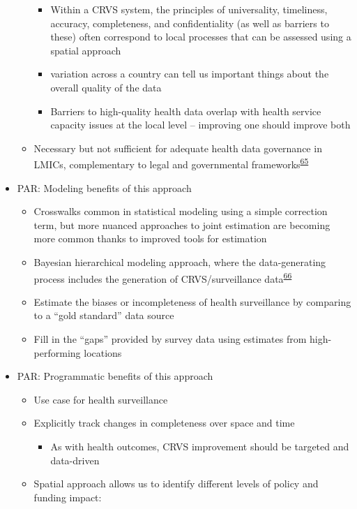 \documentclass[
]{article}
\providecommand{\tightlist}{%
  \setlength{\itemsep}{0pt}\setlength{\parskip}{0pt}}
\begin{document}
\begin{itemize}
\begin{itemize}
    \begin{itemize}
    \tightlist
    \item
      Within a CRVS system, the principles of universality, timeliness, accuracy, completeness, and confidentiality (as well as barriers to these) often correspond to local processes that can be assessed using a spatial approach
    \item
      variation across a country can tell us important things about the overall quality
      of the data
    \item
      Barriers to high-quality health data overlap with health service capacity issues at
      the local level -- improving one should improve both
    \end{itemize}
  \item
    Necessary but not sufficient for adequate health data governance in LMICs, complementary to legal and governmental frameworks\textsuperscript{\protect\hyperlink{ref-Tiffin2019}{65}}
  \end{itemize}
\item
  PAR: Modeling benefits of this approach

  \begin{itemize}
  \tightlist
  \item
    Crosswalks common in statistical modeling using a simple correction term, but more
    nuanced approaches to joint estimation are becoming more common thanks to improved
    tools for estimation
  \item
    Bayesian hierarchical modeling approach, where the data-generating process includes the generation of CRVS/surveillance data\textsuperscript{\protect\hyperlink{ref-Schmertmann2018}{66}}
  \item
    Estimate the biases or incompleteness of health surveillance by comparing to a
    ``gold standard'' data source
  \item
    Fill in the ``gaps'' provided by survey data using estimates from high-performing locations
  \end{itemize}
\item
  PAR: Programmatic benefits of this approach

  \begin{itemize}
  \tightlist
  \item
    Use case for health surveillance
  \item
    Explicitly track changes in completeness over space and time

    \begin{itemize}
    \tightlist
    \item
      As with health outcomes, CRVS improvement should be targeted and data-driven
    \end{itemize}
  \item
    Spatial approach allows us to identify different levels of policy and funding impact:


\end{itemize}
\end{itemize}
\end{document}
